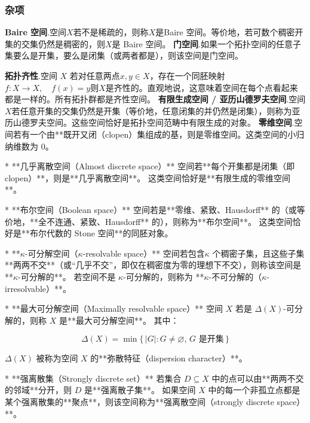 \subsubsection{杂项}
\textbf{Baire 空间}.空间$X$若不是稀疏的，则称$X$是Baire 空间。等价地，若可数个稠密开集的交集仍然是稠密的，则$X$是 Baire 空间。
\textbf{门空间}.如果一个拓扑空间的任意子集要么是开集，要么是闭集（或两者都是），则该空间是门空间。

\textbf{拓扑齐性}.空间 $X$ 若对任意两点$x, y \in X$，存在一个同胚映射$f: X \to X,\quad f(x) = y$则$X$是齐性的。直观地说，这意味着空间在每个点看起来都是一样的。所有拓扑群都是齐性空间。
\textbf{有限生成空间 / 亚历山德罗夫空间}.空间$X$若任意开集的交集仍然是开集（等价地，任意闭集的并仍然是闭集），则称为亚历山德罗夫空间。这些空间恰好是拓扑空间范畴中有限生成的对象。
\textbf{零维空间}.空间若有一个由**既开又闭（clopen）集组成的基，则是零维空间。这类空间的小归纳维数为 0。

* **几乎离散空间（Almost discrete space）**
  空间若**每个开集都是闭集（即 clopen）**，则是**几乎离散空间**。
  这类空间恰好是**有限生成的零维空间**。

* **布尔空间（Boolean space）**
  空间若是**零维、紧致、Hausdorff** 的（或等价地，**全不连通、紧致、Hausdorff** 的），则称为**布尔空间**。
  这类空间恰好是**布尔代数的 Stone 空间**的同胚对象。

* **$\kappa$-可分解空间（$\kappa$-resolvable space）**
  空间若包含\*\*$\kappa$ 个稠密子集\*\*，且这些子集**两两不交**（或“几乎不交”，即仅在稠密度为零的理想下不交），则称该空间是 **$\kappa$-可分解的**。
  若空间不是 $\kappa$-可分解的，则称为 **$\kappa$-不可分解的（$\kappa$-irresolvable）**。

* **最大可分解空间（Maximally resolvable space）**
  空间 $X$ 若是 $\Delta(X)$-可分解的，则称 $X$ 是**最大可分解空间**。
  其中：

  $$
  \Delta(X) = \min\{\,|G| : G \neq \varnothing, \, G \text{ 是开集}\,\}
  $$

  $\Delta(X)$ 被称为空间 $X$ 的**弥散特征（dispersion character）**。

* **强离散集（Strongly discrete set）**
  若集合 $D \subseteq X$ 中的点可以由**两两不交的邻域**分开，则 $D$ 是**强离散子集**。
  如果空间 $X$ 中的每一个非孤立点都是某个强离散集的**聚点**，则该空间称为**强离散空间（strongly discrete space）**。
